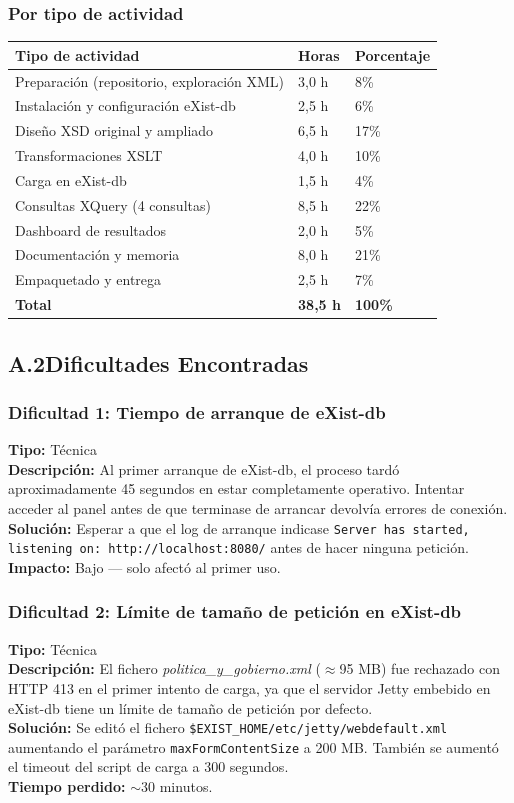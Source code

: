 \documentclass[11pt,a4paper]{article}
\newcommand{\notetitle}[1]{\subsubsection*{#1}}
\begin{document}
\vspace{8pt}
\notetitle{Por tipo de actividad}

\begin{center}
\begin{tabular}{L{9cm} C{2cm} C{2.5cm}}
\toprule
\textbf{Tipo de actividad} & \textbf{Horas} & \textbf{Porcentaje} \\
\midrule
Preparación (repositorio, exploración XML) & 3,0 h & 8\% \\
Instalación y configuración eXist-db & 2,5 h & 6\% \\
Diseño XSD original y ampliado & 6,5 h & 17\% \\
Transformaciones XSLT & 4,0 h & 10\% \\
Carga en eXist-db & 1,5 h & 4\% \\
Consultas XQuery (4 consultas) & 8,5 h & 22\% \\
Dashboard de resultados & 2,0 h & 5\% \\
Documentación y memoria & 8,0 h & 21\% \\
Empaquetado y entrega & 2,5 h & 7\% \\
\midrule
{}
\textbf{Total} & \textbf{38,5 h} & \textbf{100\%} \\
\bottomrule
\end{tabular}
\end{center}

\vspace{12pt}
\subsection*{A.2\quad Dificultades Encontradas}

\notetitle{Dificultad 1: Tiempo de arranque de eXist-db}
\textbf{Tipo:} Técnica\\
\textbf{Descripción:} Al primer arranque de eXist-db, el proceso tardó aproximadamente 45 segundos en estar completamente operativo. Intentar acceder al panel antes de que terminase de arrancar devolvía errores de conexión.\\
\textbf{Solución:} Esperar a que el log de arranque indicase \texttt{Server has started, listening on: http://localhost:8080/} antes de hacer ninguna petición.\\
\textbf{Impacto:} Bajo --- solo afectó al primer uso.

\vspace{6pt}
\notetitle{Dificultad 2: Límite de tamaño de petición en eXist-db}
\textbf{Tipo:} Técnica\\
\textbf{Descripción:} El fichero \textit{politica\_y\_gobierno.xml} ($\approx$95 MB) fue rechazado con HTTP 413 en el primer intento de carga, ya que el servidor Jetty embebido en eXist-db tiene un límite de tamaño de petición por defecto.\\
\textbf{Solución:} Se editó el fichero \texttt{\$EXIST\_HOME/etc/jetty/webdefault.xml} aumentando el parámetro \texttt{maxFormContentSize} a 200 MB. También se aumentó el timeout del script de carga a 300 segundos.\\
\textbf{Tiempo perdido:} $\sim$30 minutos.
\end{document}
